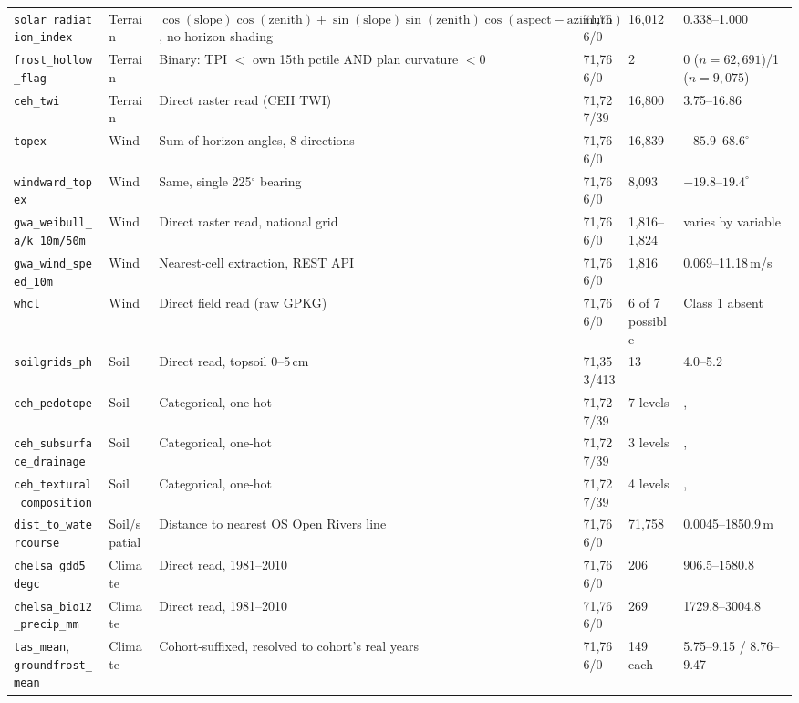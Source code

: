 {\begin{longtable}{p{2.3cm}p{1.6cm}p{3.0cm}p{1.3cm}p{1.1cm}p{2.3cm}}
\texttt{solar\_radiation\_index} & Terrain & $\cos(\text{slope})\cos(\text{zenith})+\sin(\text{slope})\sin(\text{zenith})\cos(\text{aspect}-\text{azimuth})$, no horizon shading & 71{,}766/0 & 16{,}012 & 0.338--1.000 \\
\texttt{frost\_hollow\_flag} & Terrain & Binary: TPI $<$ own 15th pctile AND plan curvature $<0$ & 71{,}766/0 & 2 & 0 ($n{=}62{,}691$)/1 ($n{=}9{,}075$) \\
\texttt{ceh\_twi} & Terrain & Direct raster read (CEH TWI) & 71{,}727/39 & 16{,}800 & 3.75--16.86 \\
\texttt{topex} & Wind & Sum of horizon angles, 8 directions \citep{wilson1984} & 71{,}766/0 & 16{,}839 & $-85.9$--$68.6^\circ$ \\
\texttt{windward\_topex} & Wind & Same, single 225$^\circ$ bearing & 71{,}766/0 & 8{,}093 & $-19.8$--$19.4^\circ$ \\
\texttt{gwa\_weibull\_a/k\_10m/50m} & Wind & Direct raster read, national grid & 71{,}766/0 & 1{,}816--1{,}824 & varies by variable \\
\texttt{gwa\_wind\_speed\_10m} & Wind & Nearest-cell extraction, REST API & 71{,}766/0 & 1{,}816 & 0.069--11.18\,m/s \\
\texttt{whcl} & Wind & Direct field read (raw GPKG) & 71{,}766/0 & 6 of 7 possible & Class 1 absent \\
\texttt{soilgrids\_ph} & Soil & Direct read, topsoil 0--5\,cm & 71{,}353/413 & 13 & 4.0--5.2 \\
\texttt{ceh\_pedotope} & Soil & Categorical, one-hot & 71{,}727/39 & 7 levels &, \\
\texttt{ceh\_subsurface\_drainage} & Soil & Categorical, one-hot & 71{,}727/39 & 3 levels &, \\
\texttt{ceh\_textural\_composition} & Soil & Categorical, one-hot & 71{,}727/39 & 4 levels &, \\
\texttt{dist\_to\_watercourse} & Soil/spatial & Distance to nearest OS Open Rivers line & 71{,}766/0 & 71{,}758 & 0.0045--1850.9\,m \\
\texttt{chelsa\_gdd5\_degc} & Climate & Direct read, 1981--2010 & 71{,}766/0 & 206 & 906.5--1580.8 \\
\texttt{chelsa\_bio12\_precip\_mm} & Climate & Direct read, 1981--2010 & 71{,}766/0 & 269 & 1729.8--3004.8 \\
\texttt{tas\_mean}, \texttt{groundfrost\_mean} & Climate & Cohort-suffixed, resolved to cohort's real years & 71{,}766/0 & 149 each & 5.75--9.15 / 8.76--9.47 \\

\end{longtable}}
